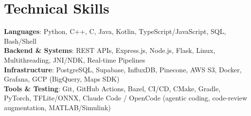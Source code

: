 \documentclass[letterpaper,11pt]{article}
\begin{document}
      \resumeItemListEnd
  
  \resumeSubHeadingListEnd

\section{Technical Skills}
 \resumeSubHeadingListStart
    \small{
      \item{
        \textbf{Languages}{: Python, C++, C, Java, Kotlin, TypeScript/JavaScript, SQL, Bash/Shell} \\
        \textbf{Backend \& Systems}{: REST APIs, Express.js, Node.js, Flask, Linux, Multithreading, JNI/NDK, Real-time Pipelines} \\
        \textbf{Infrastructure}{: PostgreSQL, Supabase, InfluxDB, Pinecone, AWS S3, Docker, Grafana, GCP (BigQuery, Maps SDK)} \\
        \textbf{Tools \& Testing}{: Git, GitHub Actions, Bazel, CI/CD, CMake, Gradle, PyTorch, TFLite/ONNX, Claude Code / OpenCode (agentic coding, code-review augmentation, MATLAB/Simulink)}    
      }
    }
 \resumeSubHeadingListEnd

\end{document}
